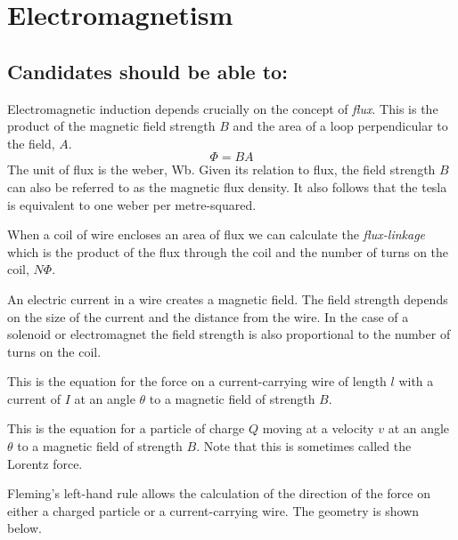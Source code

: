 \documentclass[main.tex]{subfiles}
\begin{document}
\chapter{Electromagnetism}

\section*{Candidates should be able to:}

Electromagnetic induction depends crucially on the concept of \emph{flux}. This is the product of the magnetic field strength $B$ and the area of a loop perpendicular to the field, $A$.
\[ \Phi = BA \]
The unit of flux is the weber, Wb. Given its relation to flux, the field strength $B$ can also be referred to as the magnetic flux density. It also follows that the tesla is equivalent to one weber per metre-squared.

When a coil of wire encloses an area of flux we can calculate the \emph{flux-linkage} which is the product of the flux through the coil and the number of turns on the coil, $N\Phi$.


An electric current in a wire creates a magnetic field. The field strength depends on the size of the current and the distance from the wire. In the case of a solenoid or electromagnet the field strength is also proportional to the number of turns on the coil.


This is the equation for the force on a current-carrying wire of length $l$ with a current of $I$ at an angle $\theta$ to a magnetic field of strength $B$.


This is the equation for a particle of charge $Q$ moving at a velocity $v$ at an angle $\theta$ to a magnetic field of strength $B$. Note that this is sometimes called the Lorentz force.


Fleming's left-hand rule allows the calculation of the direction of the force on either a charged particle or a current-carrying wire. The geometry is shown below.
\end{document}
